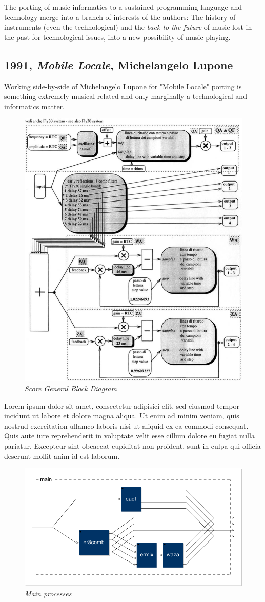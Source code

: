 \documentclass[twoside,a4paper]{article}
\begin{document}
The porting of music informatics to a sustained programming language and technology merge into a branch of interests of the authors: The history of instruments (even the technological) and the \emph{back to the future} of music lost in the past for technological issues, into a new possibility of music playing. 


\subsection{1991, \emph{Mobile Locale}, Michelangelo Lupone}

Working side-by-side of Michelangelo Lupone for "Mobile Locale" porting is something extremely musical related and only marginally a technological and informatics matter. 

\begin{figure}[ht]
\centerline{\includegraphics[width=.45\textwidth]{img/1-comp}}
\caption{\label{ml-gen-dia}{\it Score General Block Diagram}}
\end{figure}

Lorem ipsum dolor sit amet, consectetur adipisici elit, sed eiusmod tempor
incidunt ut labore et dolore magna aliqua. Ut enim ad minim veniam, quis
nostrud exercitation ullamco laboris nisi ut aliquid ex ea commodi consequat.
Quis aute iure reprehenderit in voluptate velit esse cillum dolore eu fugiat
nulla pariatur. Excepteur sint obcaecat cupiditat non proident, sunt in culpa
qui officia deserunt mollit anim id est laborum.

\begin{figure}[ht]
\centerline{\includegraphics[width=.45\textwidth]{img/main}}
\caption{\label{ml-main}{\it Main processes}}
\end{figure}
\end{document}
